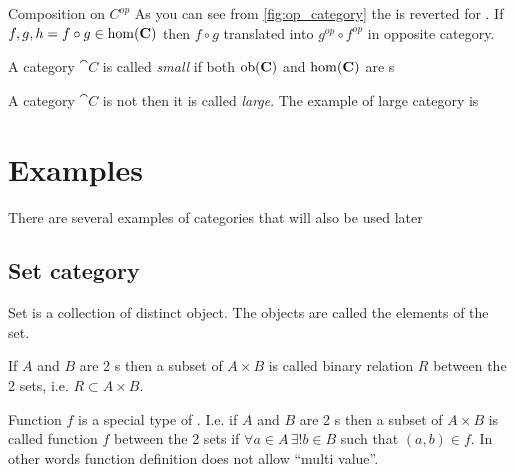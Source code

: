 \begin{remark}{Composition on $C^{op}$}
\label{rem:op_composition}
As you can see from \cref{fig:op_category} the
 is reverted for
. If $f,g,h = f \circ g \in
\mathrm{hom}(\mathbf{C})$ then $f \circ g$ translated into $g^{op} \circ
f^{op}$ in opposite category.
\end{remark}

\begin{definition}
\label{def:small_category}
A category $\cat{C}$ is called \textit{small} if both $\mathrm{ob}(\mathbf{C})$ and
$\mathrm{hom}(\mathbf{C})$ are s
\end{definition}

\begin{definition}
\label{def:large_category}
A category $\cat{C}$ is not  then it is
called \textit{large}. The example of large category is
\end{definition}

\section{Examples}

There are several examples of categories that will also be used later

\subsection{\textbf{Set} category}

\begin{definition}[Set]
  \label{def:set}
  Set is a collection of distinct object. The objects are called the
  elements of the set.
\end{definition}

\begin{definition}
  \label{def:binary_relation}
  If $A$ and $B$ are 2 s then a subset of $A \times B$ is
  called binary relation $R$ between the 2 sets, i.e. $R \subset A \times B$.
\end{definition}

\begin{definition}[Function]
  \label{def:function}
  Function $f$ is a special type of . I.e.
  if $A$ and $B$ are 2 s then a subset of $A \times B$ is
  called function $f$ between the 2 sets if $\forall a \in A \, \exists!
  b \in B$ such that $(a,b) \in f$. In other words function definition
  does not allow ``multi value''.
\end{definition}


